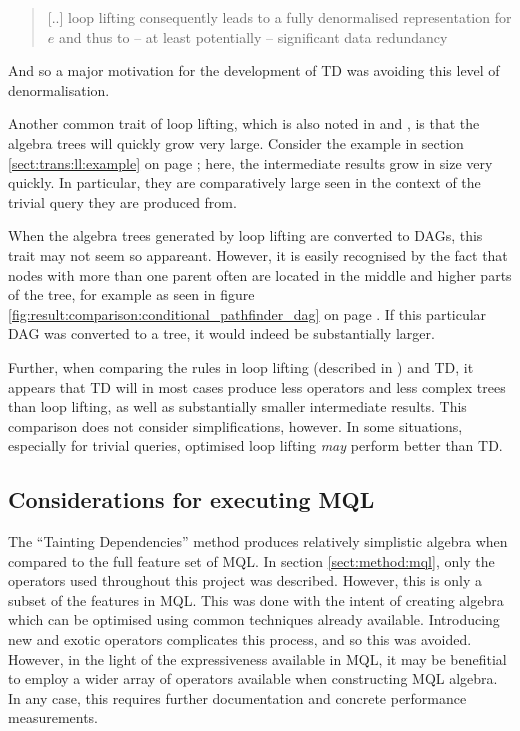 \begin{quote}
[..] loop lifting consequently leads to a fully denormalised representation for
$e$ and thus to -- at least potentially -- significant data redundancy
\end{quote}

And so a major motivation for the development of TD was avoiding this level of
denormalisation.

Another common trait of loop lifting, which is also noted in
\cite{pathfinder_mothertongue} and \cite{pathfinder_purelyRelational}, is that
the algebra trees will quickly grow very large. Consider the example in section 
\ref{sect:trans:ll:example} on page \pageref{sect:trans:ll:example}; here, the
intermediate results grow in size very quickly. In particular, they are
comparatively large seen in the context of the trivial query they are produced
from.

When the algebra trees generated by loop lifting are converted to DAGs, this
trait may not seem so appareant. However, it is easily recognised by the fact
that nodes with more than one parent often are located in the middle and higher
parts of the tree, for example as seen in figure
\ref{fig:result:comparison:conditional_pathfinder_dag} on page
\pageref{fig:result:comparison:conditional_pathfinder_dag}. If this particular
DAG was converted to a tree, it would indeed be substantially larger.

Further, when comparing the rules in loop lifting (described in
\cite{pathfinder_mothertongue}) and TD, it appears that TD will in most cases
produce less operators and less complex trees than loop lifting, as well as
substantially smaller intermediate results. This comparison does not consider
simplifications, however. In some situations, especially for trivial queries,
optimised loop lifting \emph{may} perform better than TD. 

\subsection{Considerations for executing MQL}
The ``Tainting Dependencies'' method produces relatively simplistic algebra
when compared to the full feature set of MQL. In section \ref{sect:method:mql},
only the operators used throughout this project was described. However, this is
only a subset of the features in MQL. This was done with the intent of creating
algebra which can be optimised using common techniques already available.
Introducing new and exotic operators complicates this process, and so this was
avoided. However, in the light of the expressiveness available in MQL, it may
be benefitial to employ a wider array of operators available when constructing
MQL algebra. In any case, this requires further documentation and concrete
performance measurements.